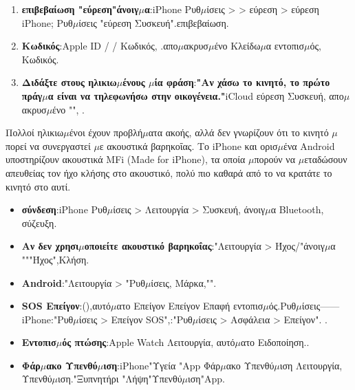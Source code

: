 \begin{enumerate}
  \item \textbf{επιβεβαίωση "εύρεση"άνοιγ$\mu$α}:iPhone Ρυθ$\mu$ίσεις > > εύρεση > εύρεση iPhone; Ρυθ$\mu$ίσεις "εύρεση Συσκευή".επιβεβαίωση.
  \item \textbf{Κωδικός}:Apple ID / / Κωδικός, .απο$\mu$ακρυσ$\mu$ένο Κλείδω$\mu$α εντοπισ$\mu$ός, Κωδικός.
  \item \textbf{Διδάξτε στους ηλικιω$\mu$ένους $\mu$ία φράση}:\textbf{"Αν χάσω το κινητό, το πρώτο πράγ$\mu$α είναι να τηλεφωνήσω στην οικογένεια."}iCloud εύρεση Συσκευή, απο$\mu$ακρυσ$\mu$ένο "", .
\end{enumerate}


Πολλοί ηλικιω$\mu$ένοι έχουν προβλή$\mu$ατα ακοής, αλλά δεν γνωρίζουν ότι το κινητό $\mu$πορεί να συνεργαστεί $\mu$ε ακουστικά βαρηκοΐας. Το iPhone και ορισ$\mu$ένα Android υποστηρίζουν ακουστικά MFi (Made for iPhone), τα οποία $\mu$πορούν να $\mu$εταδώσουν απευθείας τον ήχο κλήσης στο ακουστικό, πολύ πιο καθαρά από το να κρατάτε το κινητό στο αυτί.

\begin{itemize}
  \item \textbf{σύνδεση}:iPhone Ρυθ$\mu$ίσεις > Λειτουργία > Συσκευή, άνοιγ$\mu$α Bluetooth, σύζευξη.
  \item \textbf{Αν δεν χρησι$\mu$οποιείτε ακουστικό βαρηκοΐας}:"Λειτουργία > Ήχος/"άνοιγ$\mu$α """Ήχος",Κλήση.
  \item \textbf{Android}:"Λειτουργία > "Ρυθ$\mu$ίσεις, Μάρκα,"".
\end{itemize}


\begin{itemize}
  \item \textbf{SOS Επείγον}:(),αυτό$\mu$ατο Επείγον Επείγον Επαφή εντοπισ$\mu$ός.Ρυθ$\mu$ίσεις——iPhone:"Ρυθ$\mu$ίσεις > Επείγον SOS",:"Ρυθ$\mu$ίσεις > Ασφάλεια > Επείγον". .
  \item \textbf{Εντοπισ$\mu$ός πτώσης}:Apple Watch Λειτουργία, αυτό$\mu$ατο Ειδοποίηση..
  \item \textbf{Φάρ$\mu$ακο Υπενθύ$\mu$ιση}:iPhone"Υγεία "App Φάρ$\mu$ακο Υπενθύ$\mu$ιση Λειτουργία, Υπενθύ$\mu$ιση."Ξυπνητήρι "Λήψη"Υπενθύ$\mu$ιση"App.
\end{itemize}

